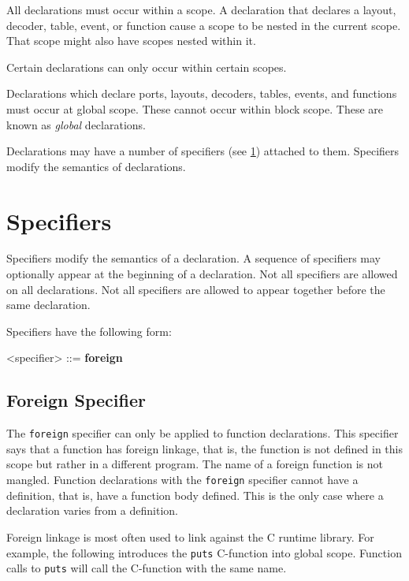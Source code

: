 All declarations must occur within a scope. A declaration that declares a layout, decoder, table, event, or function cause a scope to be nested in the current scope. That scope might also have scopes nested within it.

Certain declarations can only occur within certain scopes.

Declarations which declare ports, layouts, decoders, tables, events, and functions must occur at global scope. These cannot occur within block scope. These are known as \textit{global} declarations.

Declarations may have a number of specifiers (see \ref{spec_guide}) attached to them. Specifiers modify the semantics of declarations.

\section{Specifiers} \label{spec_guide}

Specifiers modify the semantics of a declaration. A sequence of specifiers may optionally appear at the beginning of a declaration. Not all specifiers are allowed on all declarations. Not all specifiers are allowed to appear together before the same declaration.

Specifiers have the following form:

\begin{grammar}
\singlespace
<specifier> ::= \textbf{foreign}
\end{grammar}

\subsection{Foreign Specifier} \label{foreign_spec}

The \texttt{foreign} specifier can only be applied to function declarations. This specifier says that a function has foreign linkage, that is, the function is not defined in this scope but rather in a different program. The name of a foreign function is not mangled. Function declarations with the \texttt{foreign} specifier cannot have a definition, that is, have a function body defined. This is the only case where a declaration varies from a definition.

Foreign linkage is most often used to link against the C runtime library. For example, the following introduces the \texttt{puts} C-function into global scope. Function calls to \texttt{puts} will call the C-function with the same name.

